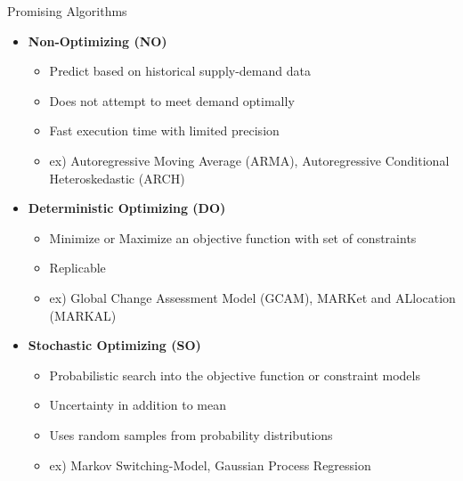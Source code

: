 \documentclass[final]{beamer}
\newlength{\onecolwid}
\newlength{\twocolwid}
\begin{document}
\begin{frame}[t]
\begin{columns}[t]
\begin{column}{\twocolwid}
\begin{columns}[t,totalwidth=\twocolwid]
\begin{column}{\onecolwid} %


\begin{block}{Promising Algorithms}
 \begin{itemize}
 	\setlength\itemsep{1.5em}
	\item \textbf{{\Large Non-Optimizing (NO)}}
	\begin{itemize}
		\setlength\itemsep{1em}
		\item {\large Predict based on historical supply-demand data}
		\item{\large  Does not attempt to meet demand optimally}
		\item {\large Fast execution time with limited precision}
		\item {\large ex) Autoregressive Moving Average (ARMA), Autoregressive Conditional Heteroskedastic (ARCH)}
	\end{itemize}
	\item \textbf{{\Large Deterministic Optimizing (DO)}}
	\begin{itemize}
		\setlength\itemsep{1em}
		\item{\large  Minimize or Maximize an objective function with set of constraints}
		\item {\large Replicable}
		\item{\large  ex) Global Change Assessment Model (GCAM), MARKet and ALlocation (MARKAL)}
	\end{itemize}
	\item \textbf{{\Large Stochastic Optimizing (SO)}}
	\begin{itemize}
		\setlength\itemsep{1em}
		\item {\large Probabilistic search into the objective function or constraint models}
		\item {\large Uncertainty in addition to mean}
		\item {\large Uses random samples from probability distributions}
		\item {\large ex) Markov Switching-Model, Gaussian Process Regression}
	\end{itemize}
\end{itemize}


\end{block}




\end{column}
\end{columns}
\end{column}
\end{columns}
\end{frame}
\end{document}
